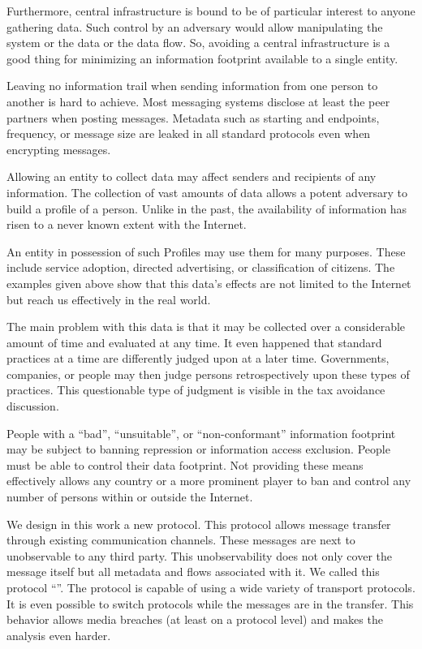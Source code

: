 Furthermore, central infrastructure is bound to be of particular interest to anyone gathering data. Such control by an adversary would allow manipulating the system or the data or the data flow. So, avoiding a central infrastructure is a good thing for minimizing an information footprint available to a single entity.

Leaving no information trail when sending information from one person to another is hard to achieve. Most messaging systems disclose at least the peer partners when posting messages. Metadata such as starting and endpoints, frequency, or message size are leaked in all standard protocols even when encrypting messages.

Allowing an entity to collect data may affect senders and recipients of any information. The collection of vast amounts of data allows a potent adversary to build a  profile of a person. Unlike in the past, the availability of information has risen to a never known extent with the Internet.

An entity in possession of such Profiles may use them for many purposes. These include service adoption, directed advertising, or classification of citizens. The examples given above show that this data's effects are not limited to the Internet but reach us effectively in the real world.

The main problem with this data is that it may be collected over a considerable amount of time and evaluated at any time. It even happened that standard practices at a time are differently judged upon at a later time. Governments, companies, or people may then judge persons retrospectively upon these types of practices. This questionable type of judgment is visible in the tax avoidance discussion\cite{Amat1999}. 

People with a ``bad'', ``unsuitable'', or ``non-conformant'' information footprint may be subject to banning repression or information access exclusion. People must be able to control their data footprint. Not providing these means effectively allows any country or a more prominent player to ban and control any number of persons within or outside the Internet. 

We design in this work a new protocol. This protocol allows message transfer through existing communication channels. These messages are next to unobservable to any third party. This unobservability does not only cover the message itself but all metadata and flows associated with it. We called this protocol ``\MessageVortex''. The protocol is capable of using a wide variety of transport protocols. It is even possible to switch protocols while the messages are in the transfer. This behavior allows media breaches (at least on a protocol level) and makes the analysis even harder.


